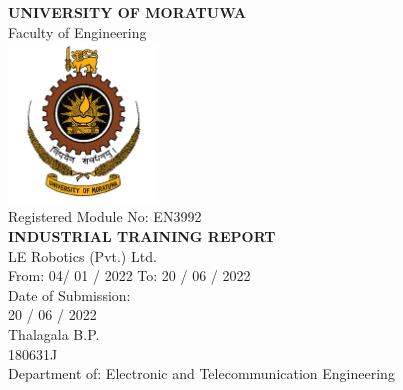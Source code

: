 \begin{titlepage}
\center %


\textbf{\large UNIVERSITY OF MORATUWA }\\[8mm]
{\large Faculty of Engineering}\\[1.5cm]
\includegraphics[width=0.3\textwidth]{figures/uomlogo}\\[1.5cm]


{\large Registered Module No: EN3992}\\[5mm]
\textbf{\large INDUSTRIAL TRAINING REPORT}\\[1cm]


{\large LE Robotics (Pvt.) Ltd.}\\[0.5cm]

{\large From: 04/ 01 / 2022 To: 20 / 06 / 2022}\\[1cm]

{\large Date of Submission:}\\[2mm]
{\large 20 / 06 / 2022} \\[1cm]

{\large Thalagala B.P.}\\[4mm]
{\large 180631J}\\[1cm]

{\large Department of: Electronic and Telecommunication Engineering}


\vfill %

\end{titlepage}